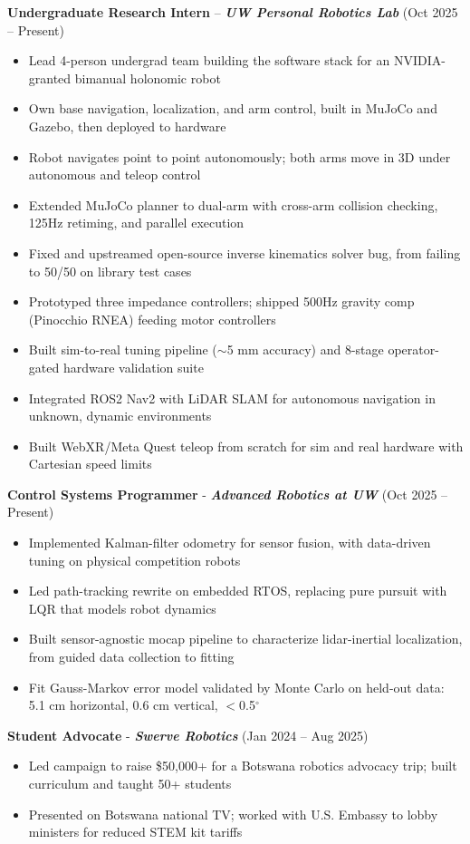 \documentclass[letterpaper,11pt]{article}
\newcommand{\role}[4]{\textbf{#1} #4 \textbf{\textit{#2}} (#3)}
\begin{document}
\role{Undergraduate Research Intern}{UW Personal Robotics Lab}{Oct 2025 -- Present}{--}
\begin{itemize}
  \item Lead 4-person undergrad team building the software stack for an NVIDIA-granted bimanual holonomic robot
  \item Own base navigation, localization, and arm control, built in MuJoCo and Gazebo, then deployed to hardware
  \item Robot navigates point to point autonomously; both arms move in 3D under autonomous and teleop control
  \item Extended MuJoCo planner to dual-arm with cross-arm collision checking, 125Hz retiming, and parallel execution
  \item Fixed and upstreamed open-source inverse kinematics solver bug, from failing to 50/50 on library test cases
  \item Prototyped three impedance controllers; shipped 500Hz gravity comp (Pinocchio RNEA) feeding motor controllers
  \item Built sim-to-real tuning pipeline ($\sim$5 mm accuracy) and 8-stage operator-gated hardware validation suite
  \item Integrated ROS2 Nav2 with LiDAR SLAM for autonomous navigation in unknown, dynamic environments
  \item Built WebXR/Meta Quest teleop from scratch for sim and real hardware with Cartesian speed limits
\end{itemize}

\role{Control Systems Programmer}{Advanced Robotics at UW}{Oct 2025 -- Present}{-}
\begin{itemize}
  \item Implemented Kalman-filter odometry for sensor fusion, with data-driven tuning on physical competition robots
  \item Led path-tracking rewrite on embedded RTOS, replacing pure pursuit with LQR that models robot dynamics
  \item Built sensor-agnostic mocap pipeline to characterize lidar-inertial localization, from guided data collection to fitting
  \item Fit Gauss-Markov error model validated by Monte Carlo on held-out data: 5.1 cm horizontal, 0.6 cm vertical, $<$0.5$^\circ$
\end{itemize}

\role{Student Advocate}{Swerve Robotics}{Jan 2024 -- Aug 2025}{-}
\begin{itemize}
  \item Led campaign to raise \$50,000+ for a Botswana robotics advocacy trip; built curriculum and taught 50+ students
  \item Presented on Botswana national TV; worked with U.S. Embassy to lobby ministers for reduced STEM kit tariffs
\end{itemize}
\end{document}

